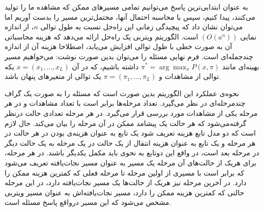 	 به عنوان ابتدایی‌ترین پاسخ می‌توانیم تمامی مسیرهای ممکن که مشاهده ما را تولید می‌کنند، پیدا کنیم، سپس با محاسبه احتمال آنها، محتمل‌ترین مسیر را بدست آوریم اما می‌توان نشان داد که پیچیدگی زمانی این راه‌حل نسبت به طول توالی $n$، از اندازه نمایی $(O(a^n))$ است. الگوریتم ویتربی یک راه‌حل ارائه می‌دهد که هزینه محاسباتی آن به صورت خطی با طول توالی افزایش می‌یابد، اصطلاحا هزینه آن از اندازه چندجمله‌ای است. فرم نهایی مسئله را می‌توان بدین صورت نوشت: می‌خواهیم مسیر بهینه‌ای مانند $\displaystyle \pi^* = \arg \max_\pi P(x,\pi)$ داشته باشیم، که در آن $x=(x_1, \dots, x_L)$ یکه توالی از مشاهدات و $\pi = (\pi_1, \dots, \pi_L)$ یک توالی از متغیرهای پنهان باشد. 
	 
	 نحوه‌ی عملکرد این الگوریتم بدین صورت است که مسئله را به صورت یک گراف چندمرحله‌ای در نظر می‌گیرد. تعداد مرحله‌ها برابر است با تعداد مشاهدات و در هر مرحله یکی از مشاهدات مورد بررسی قرار می‌گیرد. در هر مرحله تعدادی حالت درنظر گرفته‌می‌شود که هر حالت یک پیشامد ممکن در آن مرحله را بیان می‌کند. حال لازم است که دو مدل تابع هزینه تعریف شود یک تابع به عنوان هزینه‌ی بودن در هر حالت در هر مرحله و یک تابع به عنوان هزینه انتقال از یک حالت در یک مرحله به یک حالت دیگر در مرحله بعد است، در واقع این دوتابع به نحوی باید مکمل یکدیگر باشند. در هر مرحله، برای هریک از حالت‌های آن مرحله یک مسیر به عنوان مسیر نجات‌یافته تعریف می‌شود که برابر است با مسیری از اولین مرحله تا مرحله فعلی که کمترین هزینه ممکن را دارد. در آخرین مرحله نیز هریک از حالت‌ها یک مسیر نجات‌یافته دارد، در این مرحله حالتی که کمترین هزینه ممکن را دارد، مسیر نجات‌یافته‌اش به عنوان مسیر ویتربی مشخص می‌شود که این مسیر درواقع پاسخ مسئله است. 
